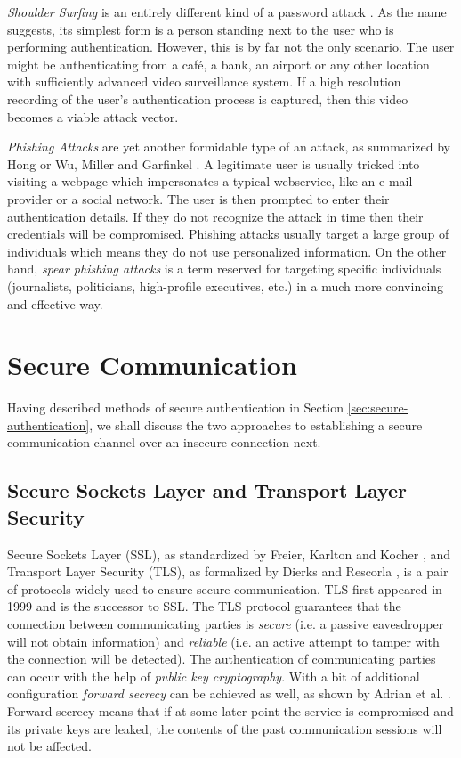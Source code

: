 \emph{Shoulder Surfing} is an entirely different kind of a password attack \cite{raza:2012:password-attacks-survey, suo:2005:graphical-passwords-survey} . As the name suggests, its simplest form is a person standing next to the user who is performing authentication. However, this is by far not the only scenario. The user might be authenticating from a café, a bank, an airport or any other location with sufficiently advanced video surveillance system. If a high resolution recording of the user's authentication process is captured, then this video becomes a viable attack vector.

\emph{Phishing Attacks} are yet another formidable type of an attack, as summarized by Hong \cite{hong2012state} or Wu, Miller and Garfinkel \cite{Wu:2006:STA:1124772.1124863}. A legitimate user is usually tricked into visiting a webpage which impersonates a typical webservice, like an e-mail provider or a social network. The user is then prompted to enter their authentication details. If they do not recognize the attack in time then their credentials will be compromised. Phishing attacks usually target a large group of individuals which means they do not use personalized information. On the other hand, \emph{spear phishing attacks} is a term reserved for targeting specific individuals (journalists, politicians, high-profile executives, etc.) in a much more convincing and effective way.

\section{Secure Communication}
\label{sec:secure-communication}

Having described methods of secure authentication in Section \ref{sec:secure-authentication}, we shall discuss the two approaches to establishing a secure communication channel over an insecure connection next.

\subsection{Secure Sockets Layer and Transport Layer Security}
\label{subsec:ssl-tls}

Secure Sockets Layer (SSL), as standardized by Freier, Karlton and Kocher \cite{rfc6101}, and Transport Layer Security (TLS), as formalized by Dierks and Rescorla \cite{rfc5246}, is a pair of protocols widely used to ensure secure communication. TLS first appeared in 1999 and is the successor to SSL. The TLS protocol guarantees that the connection between communicating parties is \emph{secure} (i.e. a passive eavesdropper will not obtain information) and \emph{reliable} (i.e. an active attempt to tamper with the connection will be detected). The authentication of communicating parties can occur with the help of \emph{public key cryptography}. With a bit of additional configuration \emph{forward secrecy} can be achieved as well, as shown by Adrian et al. \cite{Adrian:2015:IFS:2810103.2813707}. Forward secrecy means that if at some later point the service is compromised and its private keys are leaked, the contents of the past communication sessions will not be affected.

